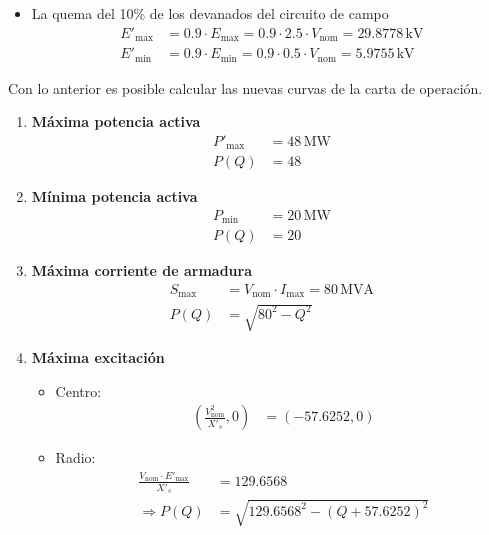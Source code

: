 \documentclass[
  11pt,
  letterpaper,
   addpoints,
   answers
  ]{exam}
\begin{document}
\begin{questions}
\begin{solution}
\begin{itemize}
            \item La quema del 10\% de los devanados del circuito de campo
            \begin{align}
            E'_{\text{max}} &= 0.9 \cdot E_{\text{max}} = 0.9 \cdot 2.5 \cdot V_{\text{nom}} = 29.8778 \, \text{kV} \\
            E'_{\text{min}} &= 0.9 \cdot E_{\text{min}} = 0.9 \cdot 0.5 \cdot V_{\text{nom}} = 5.9755 \, \text{kV}
            \end{align}
        \end{itemize}
        
        Con lo anterior es posible calcular las nuevas curvas de la carta de operación.
        
        \begin{enumerate}
            \item \textbf{Máxima potencia activa}
            \begin{align}
            P'_{\text{max}} &= 48 \, \text{MW} \\
            P(Q) &= 48
            \end{align}
        
            \item \textbf{Mínima potencia activa}
            \begin{align}
            P_{\text{min}} &= 20 \, \text{MW} \\
            P(Q) &= 20
            \end{align}
        
            \item \textbf{Máxima corriente de armadura}
            \begin{align}
            S_{\text{max}} &= V_{\text{nom}} \cdot I_{\text{max}} = 80 \, \text{MVA} \\
            P(Q) &= \sqrt{80^2 - Q^2}
            \end{align}
        
            \item \textbf{Máxima excitación}
            \begin{itemize}
                \item Centro:
                \begin{align}
                \left( \frac{V_{\text{nom}}^2}{X'_s}, 0 \right) &= (-57.6252, 0)
                \end{align}
                
                \item Radio:
                \begin{align}
                \frac{V_{\text{nom}} \cdot E'_{\text{max}}}{X'_s} &= 129.6568 \\
                \Rightarrow P(Q) &= \sqrt{129.6568^2 - (Q + 57.6252)^2}
                \end{align}
            \end{itemize}
        

\end{enumerate}
\end{solution}
\end{questions}
\end{document}
